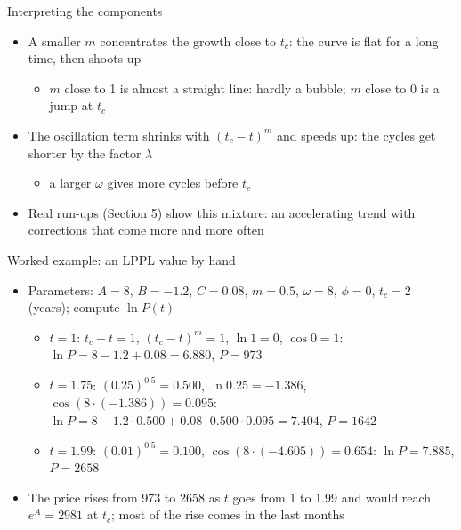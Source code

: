 \begin{frame}{Interpreting the components}
\itemsize{\small}
\begin{itemize}
    \item A smaller $m$ concentrates the growth close to $t_c$: the curve is flat for a long time, then shoots up
    \begin{itemize}
        \item $m$ close to 1 is almost a straight line: hardly a bubble; $m$ close to 0 is a jump at $t_c$
    \end{itemize}
    \item The oscillation term shrinks with $(t_c - t)^m$ and speeds up: the cycles get shorter by the factor $\lambda$
    \begin{itemize}
        \item a larger $\omega$ gives more cycles before $t_c$
    \end{itemize}
    \item Real run-ups (Section 5) show this mixture: an accelerating trend with corrections that come more and more often
\end{itemize}
\end{frame}

\begin{frame}{Worked example: an LPPL value by hand}
\itemsize{\footnotesize}
\begin{itemize}
    \item Parameters: $A = 8$, $B = -1.2$, $C = 0.08$, $m = 0.5$, $\omega = 8$, $\phi = 0$, $t_c = 2$ (years); compute $\ln P(t)$
    \begin{itemize}
        \item $t = 1$: $t_c - t = 1$, $(t_c - t)^m = 1$, $\ln 1 = 0$, $\cos 0 = 1$: $\ln P = 8 - 1.2 + 0.08 = 6.880$, $P = 973$
        \item $t = 1.75$: $(0.25)^{0.5} = 0.500$, $\ln 0.25 = -1.386$, $\cos(8 \cdot (-1.386)) = 0.095$: $\ln P = 8 - 1.2 \cdot 0.500 + 0.08 \cdot 0.500 \cdot 0.095 = 7.404$, $P = 1642$
        \item $t = 1.99$: $(0.01)^{0.5} = 0.100$, $\cos(8 \cdot (-4.605)) = 0.654$: $\ln P = 7.885$, $P = 2658$
    \end{itemize}
    \item The price rises from 973 to 2658 as $t$ goes from 1 to 1.99 and would reach $e^A = 2981$ at $t_c$; most of the rise comes in the last months
\end{itemize}
\end{frame}

